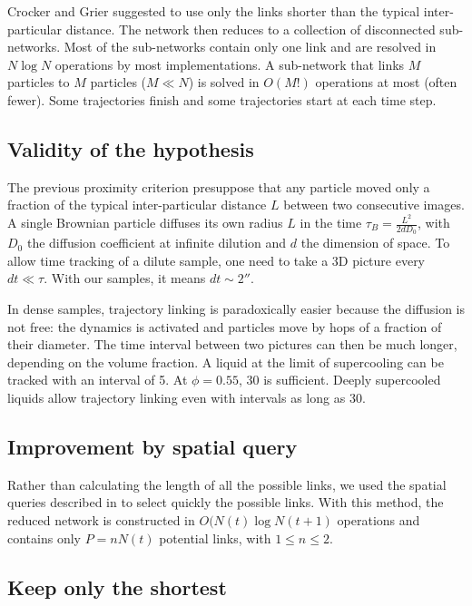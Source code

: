 Crocker and Grier suggested to use only the links shorter than the typical inter-particular distance. The network then reduces to a collection of disconnected sub-networks. Most of the sub-networks contain only one link and are resolved in $N \log N$ operations by most implementations. A sub-network that links $M$ particles to $M$ particles ($M \ll N$) is solved in $O(M!)$ operations at most (often fewer). Some trajectories finish and some trajectories start at each time step.

\subsection{Validity of the hypothesis}

The previous proximity criterion presuppose that any particle moved only a fraction of the typical inter-particular distance $L$ between two consecutive images. A single Brownian particle diffuses its own radius $L$ in the time $\tau_B = \frac{L^2}{2 d D_0}$, with $D_0$ the diffusion coefficient at infinite dilution and $d$ the dimension of space. To allow time tracking of a dilute sample, one need to take a 3D picture every $dt\ll\tau$. With our samples, it means $dt\sim \unit{2}{\second}$.

In dense samples, trajectory linking is paradoxically easier because the diffusion is not free: the dynamics is activated and particles move by hops of a fraction of their diameter. The time interval between two pictures can then be much longer, depending on the volume fraction. A liquid at the limit of supercooling can be tracked with an interval of \unit{5}{\second}. At $\phi=0.55$, \unit{30}{\second} is sufficient. Deeply supercooled liquids allow trajectory linking even with intervals as long as \unit{30}{\minute}.

\subsection{Improvement by spatial query}

Rather than calculating the length of all the possible links, we used the spatial queries described in  to select quickly the possible links. With this method, the reduced network is constructed in $O(N(t)\log N(t+1)$ operations and contains only $P=n N(t)$ potential links, with $1\leq n \leq 2$.

\subsection{Keep only the shortest}

